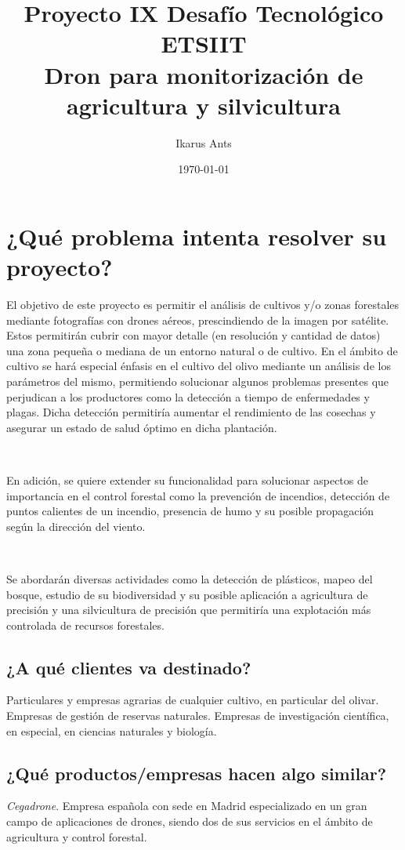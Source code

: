 \documentclass[11pt,spanish]{article} %
\title{Proyecto IX Desafío Tecnológico ETSIIT\\
		Dron para monitorización de agricultura y silvicultura }
\author{Ikarus Ants}
\date{\today}
\begin{document}
\maketitle
\tableofcontents %
\newpage
\setlength\parindent{0pt} %



\section{¿Qué problema intenta resolver su proyecto?}

El objetivo de este proyecto es permitir el análisis de cultivos y/o zonas forestales mediante fotografías con drones aéreos, prescindiendo de la imagen por satélite. Estos permitirán cubrir con mayor detalle (en resolución y cantidad de datos) una zona pequeña o mediana de un entorno natural o de cultivo. 
En el ámbito de cultivo se hará especial énfasis en el cultivo del olivo mediante un análisis de los parámetros del mismo, permitiendo solucionar algunos problemas presentes que perjudican a los productores como la detección a tiempo de enfermedades y plagas. Dicha detección permitiría aumentar el rendimiento de las cosechas y asegurar un estado de salud óptimo en dicha plantación. 

\

En adición, se quiere extender su funcionalidad para solucionar aspectos de importancia en el control forestal como la prevención de incendios, detección de puntos calientes de un incendio, presencia de humo y su posible propagación según la dirección del viento.

\

Se abordarán diversas actividades como la detección de plásticos, mapeo del bosque, estudio de su biodiversidad y su posible aplicación a agricultura de precisión y una silvicultura de precisión que permitiría una explotación más controlada de recursos forestales.


\subsection{¿A qué clientes va destinado?}
Particulares y empresas agrarias de cualquier cultivo, en particular del olivar.
Empresas de gestión de reservas naturales.
Empresas de investigación científica, en especial, en ciencias naturales y biología.


\subsection{¿Qué productos/empresas hacen algo similar?}
\textit{Cegadrone}. Empresa española con sede en Madrid especializado en un gran campo de aplicaciones de drones, siendo dos de sus servicios en el ámbito de agricultura y control forestal. 
\end{document}
